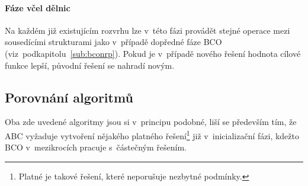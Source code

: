 \documentclass[twoside]{ctuthesis}
\begin{document}
\paragraph{Fáze včel dělnic}
Na každém již existujícím rozvrhu lze v~této fázi provádět stejné operace mezi sousedícími strukturami jako v~případě dopředné fáze BCO (viz~podkapitolu~\ref{sub:bconrp}). Pokud je v~případě nového řešení hodnota cílové funkce lepší, původní řešení se nahradí novým.

\subsection{Porovnání algoritmů}
Oba zde uvedené algoritmy jsou si v~principu podobné, liší se především tím, že ABC vyžaduje vytvoření nějakého platného řešení\footnote{Platné je takové řešení, které neporušuje nezbytné podmínky.} již v~inicializační fázi, kdežto BCO v~mezikrocích pracuje s~částečným řešením.

%
%
%
%
\end{document}
